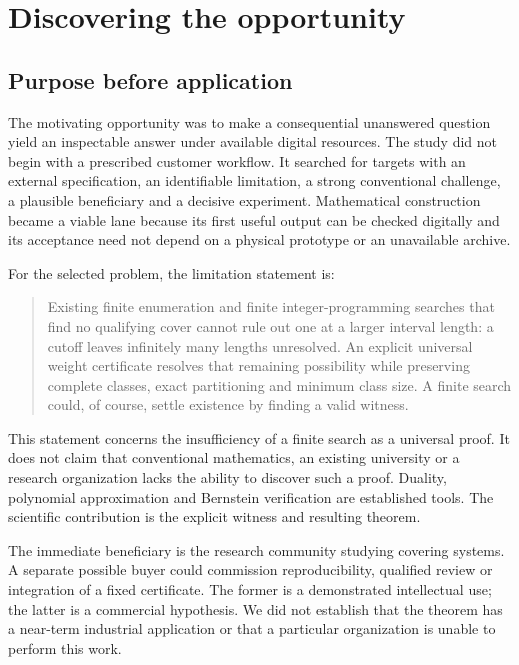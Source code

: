 \documentclass[11pt,a4paper]{article}
\begin{document}

\hypertarget{discovering-the-opportunity}{%
\section{Discovering the
opportunity}\label{discovering-the-opportunity}}


\hypertarget{purpose-before-application}{%
\subsection{Purpose before
application}\label{purpose-before-application}}

The motivating opportunity was to make a consequential unanswered
question yield an inspectable answer under available digital resources.
The study did not begin with a prescribed customer workflow. It searched
for targets with an external specification, an identifiable limitation,
a strong conventional challenge, a plausible beneficiary and a decisive
experiment. Mathematical construction became a viable lane because its
first useful output can be checked digitally and its acceptance need not
depend on a physical prototype or an unavailable archive.

For the selected problem, the limitation statement is:

\begin{quote}
Existing finite enumeration and finite integer-programming searches that
find no qualifying cover cannot rule out one at a larger interval
length: a cutoff leaves infinitely many lengths unresolved. An explicit
universal weight certificate resolves that remaining possibility while
preserving complete classes, exact partitioning and minimum class size.
A finite search could, of course, settle existence by finding a valid
witness.
\end{quote}

This statement concerns the insufficiency of a finite search as a
universal proof. It does not claim that conventional mathematics, an
existing university or a research organization lacks the ability to
discover such a proof. Duality, polynomial approximation and Bernstein
verification are established tools. The scientific contribution is the
explicit witness and resulting theorem.

The immediate beneficiary is the research community studying covering
systems. A separate possible buyer could commission reproducibility,
qualified review or integration of a fixed certificate. The former is a
demonstrated intellectual use; the latter is a commercial hypothesis. We
did not establish that the theorem has a near-term industrial
application or that a particular organization is unable to perform this
work.
\end{document}

